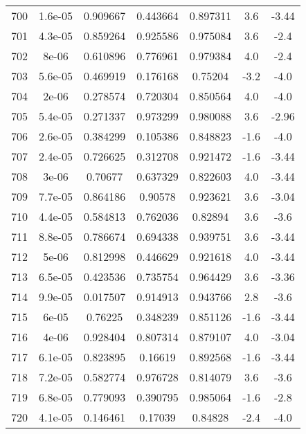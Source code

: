 \begin{table}
\begin{tabular}{c|c|c|c|c|c|c}
700 & 1.6e-05 & 0.909667 & 0.443664 & 0.897311 & 3.6 & -3.44\\
701 & 4.3e-05 & 0.859264 & 0.925586 & 0.975084 & 3.6 & -2.4\\
702 & 8e-06 & 0.610896 & 0.776961 & 0.979384 & 4.0 & -2.4\\
703 & 5.6e-05 & 0.469919 & 0.176168 & 0.75204 & -3.2 & -4.0\\
704 & 2e-06 & 0.278574 & 0.720304 & 0.850564 & 4.0 & -4.0\\
705 & 5.4e-05 & 0.271337 & 0.973299 & 0.980088 & 3.6 & -2.96\\
706 & 2.6e-05 & 0.384299 & 0.105386 & 0.848823 & -1.6 & -4.0\\
707 & 2.4e-05 & 0.726625 & 0.312708 & 0.921472 & -1.6 & -3.44\\
708 & 3e-06 & 0.70677 & 0.637329 & 0.822603 & 4.0 & -3.44\\
709 & 7.7e-05 & 0.864186 & 0.90578 & 0.923621 & 3.6 & -3.04\\
710 & 4.4e-05 & 0.584813 & 0.762036 & 0.82894 & 3.6 & -3.6\\
711 & 8.8e-05 & 0.786674 & 0.694338 & 0.939751 & 3.6 & -3.44\\
712 & 5e-06 & 0.812998 & 0.446629 & 0.921618 & 4.0 & -3.44\\
713 & 6.5e-05 & 0.423536 & 0.735754 & 0.964429 & 3.6 & -3.36\\
714 & 9.9e-05 & 0.017507 & 0.914913 & 0.943766 & 2.8 & -3.6\\
715 & 6e-05 & 0.76225 & 0.348239 & 0.851126 & -1.6 & -3.44\\
716 & 4e-06 & 0.928404 & 0.807314 & 0.879107 & 4.0 & -3.04\\
717 & 6.1e-05 & 0.823895 & 0.16619 & 0.892568 & -1.6 & -3.44\\
718 & 7.2e-05 & 0.582774 & 0.976728 & 0.814079 & 3.6 & -3.6\\
719 & 6.8e-05 & 0.779093 & 0.390795 & 0.985064 & -1.6 & -2.8\\
720 & 4.1e-05 & 0.146461 & 0.17039 & 0.84828 & -2.4 & -4.0\\
\end{tabular}
\end{table}
\newpage
